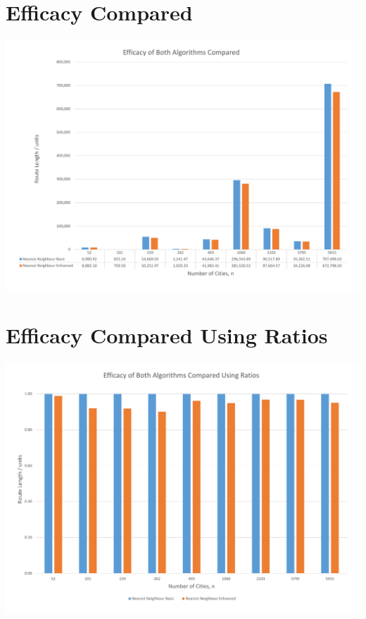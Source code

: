 \documentclass[conference,backref=page]{acmsiggraph}
\begin{document}
\clearpage
\begin{appendices}
	\section{Efficacy Compared}
		\label{efficacycomparedgraph}
		\includegraphics[width=\textwidth]{images/efficacy_compared.pdf}
	\clearpage
	\section{Efficacy Compared Using Ratios}
		\label{efficacycomparedratiosgraph}
		\includegraphics[width=\textwidth]{images/efficacy_compared_ratios.pdf}
	\clearpage

\end{appendices}
\end{document}
